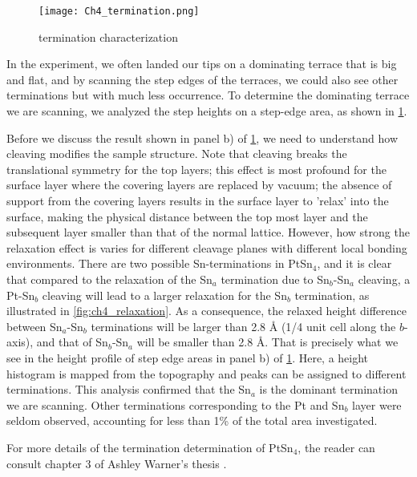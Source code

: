 \begin{figure}
	\centering
	\texttt{[image: Ch4\_termination.png]}
	\caption{termination characterization}
	\label{fig:ch4_termination}
\end{figure}

\par In the experiment, we often landed our tips on a dominating terrace that is big and flat, and by scanning the step edges of the terraces, we could also see other terminations but with much less occurrence. To determine the dominating terrace we are scanning, we analyzed the step heights on a step-edge area, as shown in \ref{fig:ch4_termination}. 

Before we discuss the result shown in panel b) of \ref{fig:ch4_termination}, we need to understand how cleaving modifies the sample structure. Note that cleaving breaks the translational symmetry for the top layers; this effect is most profound for the surface layer where the covering layers are replaced by vacuum; the absence of support from the covering layers results in the surface layer to 'relax' into the surface, making the physical distance between the top most layer and the subsequent layer smaller than that of the normal lattice. However, how strong the relaxation effect is varies for different cleavage planes with different local bonding environments. There are two possible Sn-terminations in PtSn$_4$, and it is clear that compared to the relaxation of the Sn$_a$ termination due to Sn$_b$-Sn$_a$ cleaving, a Pt-Sn$_b$ cleaving will lead to a larger relaxation for the Sn$_b$ termination, as illustrated in \ref{fig:ch4_relaxation}. As a consequence, the relaxed height difference between Sn$_a$-Sn$_b$ terminations will be larger than 2.8 {\AA} (1/4 unit cell along the $b$-axis), and that of Sn$_b$-Sn$_a$ will be smaller than 2.8 {\AA}. That is precisely what we see in the height profile of step edge areas in panel b) of \ref{fig:ch4_termination}. Here, a height histogram is mapped from the topography and peaks can be assigned to different terminations. This analysis confirmed that the Sn$_a$ is the dominant termination we are scanning. Other terminations corresponding to the Pt and Sn$_b$ layer were seldom observed, accounting for less than 1\% of the total area investigated. 

\par For more details of the termination determination of PtSn$_4$, the reader can consult chapter 3 of Ashley Warner's thesis \cite{warner_defect_nodate}.

